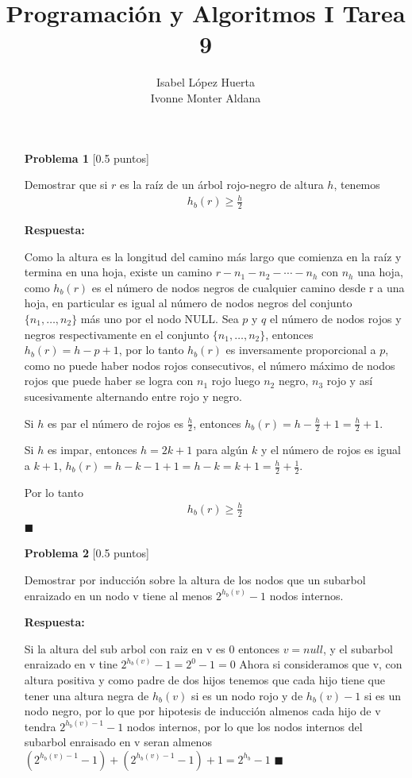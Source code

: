 \documentclass[11pt]{article}
\title{Programación y Algoritmos I Tarea 9}
\author{Isabel López Huerta\\Ivonne Monter Aldana}
\begin{document}
\maketitle

\begin{itemize}
 \item [\textbf{Problema 1}] [0.5 puntos]

Demostrar que si $r$ es la raíz de un árbol rojo-negro de altura $h$, tenemos 
\begin{align*}
h_b(r)\geq \frac{h}{2}
\end{align*}

\textbf{Respuesta:}

Como la altura es la longitud del camino más largo que comienza en la raíz y termina en una hoja, existe un camino $r-n_1-n_2-\cdots-n_h$ con $n_h$ una hoja, como $h_b(r)$ es el número de nodos negros de cualquier camino desde r a una hoja, en particular es igual al número de nodos negros del conjunto 
$\{n_1,\ldots,n_2\}$ más uno por el nodo NULL. Sea $p$ y $q$ el número de nodos rojos y negros respectivamente en el conjunto $\{n_1,\ldots,n_2\}$, entonces $h_b(r)=h-p+1$, por lo tanto $h_b(r)$ es inversamente proporcional a $p$, como no puede haber nodos rojos consecutivos, el número máximo de nodos rojos que puede haber se logra con $n_1$ rojo luego $n_2$ negro, $n_3$ rojo y así sucesivamente alternando entre rojo y negro. 

Si $h$ es par el número de rojos es $\frac{h}{2}$, entonces $h_b(r)=h-\frac{h}{2}+1=\frac{h}{2}+1$.

Si $h$ es impar, entonces $h=2k+1$ para algún $k$ y el número de rojos es igual a $k+1$, 
$h_b(r)=h-k-1+1=h-k=k+1=\frac{h}{2}+\frac{1}{2}$.

Por lo tanto
\begin{align*}
h_b(r)\geq \frac{h}{2}
\end{align*}
$\blacksquare$
\item [\textbf{Problema 2}] [0.5 puntos]

Demostrar por inducción sobre la altura de los nodos que un subarbol enraizado en un nodo v tiene
al menos $2^{h_b(v)} - 1$ nodos internos.

\textbf{Respuesta:}

Si la altura del sub arbol con raiz en v es 0 entonces $v=null$, y el subarbol enraizado en v tine $2^{h_b(v)} - 1=2^0-1=0$
Ahora si consideramos que v, con altura positiva y como padre de dos hijos tenemos que cada hijo tiene que tener una altura negra de  $h_b(v)$ si es un nodo rojo y de $h_b(v)-1$ si es un nodo negro, por lo que por hipotesis de inducción almenos cada hijo de v tendra $2^{h_b(v)-1} - 1$ nodos internos, por lo que los nodos internos del subarbol enraisado en v seran almenos $(2^{h_b(v)-1} - 1)+(2^{h_b(v)-1} - 1)+1=2^{h_b}-1$ $\blacksquare$


\end{itemize}
\end{document}
